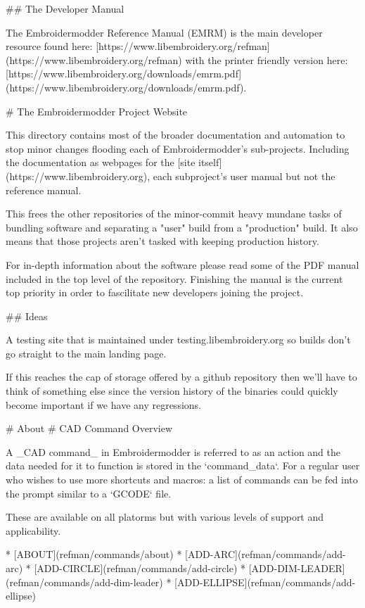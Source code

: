 ## The Developer Manual

The Embroidermodder Reference Manual (EMRM) is the main developer 
resource found here: [https://www.libembroidery.org/refman](https://www.libembroidery.org/refman) with the printer friendly version here: [https://www.libembroidery.org/downloads/emrm.pdf](https://www.libembroidery.org/downloads/emrm.pdf).

# The Embroidermodder Project Website

This directory contains most of the broader documentation and automation to
stop minor changes flooding each of Embroidermodder's sub-projects. Including
the documentation as webpages for the
[site itself](https://www.libembroidery.org), each subproject's user manual but
not the reference manual.

This frees the other repositories of the minor-commit heavy mundane tasks of
bundling software and separating a "user" build from a "production" build. It
also means that those projects aren't tasked with keeping production history.

For in-depth information about the software please read some of the PDF manual
included in the top level of the repository. Finishing the manual is the current
top priority in order to fascilitate new developers joining the project.

## Ideas

A testing site that is maintained under testing.libembroidery.org so builds
don't go straight to the main landing page.

If this reaches the cap of storage offered by a github repository then we'll
have to think of something else since the version history of the binaries could
quickly become important if we have any regressions.

# About
# CAD Command Overview

A _CAD command_ in Embroidermodder is referred to as an action and the data
needed for it to function is stored in the `command_data`. For a regular user
who wishes to use more shortcuts and macros: a list of commands can be fed into
the prompt similar to a `GCODE` file.

These are available on all platorms but with various levels of support and
applicability.

* [ABOUT](refman/commands/about)
* [ADD-ARC](refman/commands/add-arc)
* [ADD-CIRCLE](refman/commands/add-circle)
* [ADD-DIM-LEADER](refman/commands/add-dim-leader)
* [ADD-ELLIPSE](refman/commands/add-ellipse)

